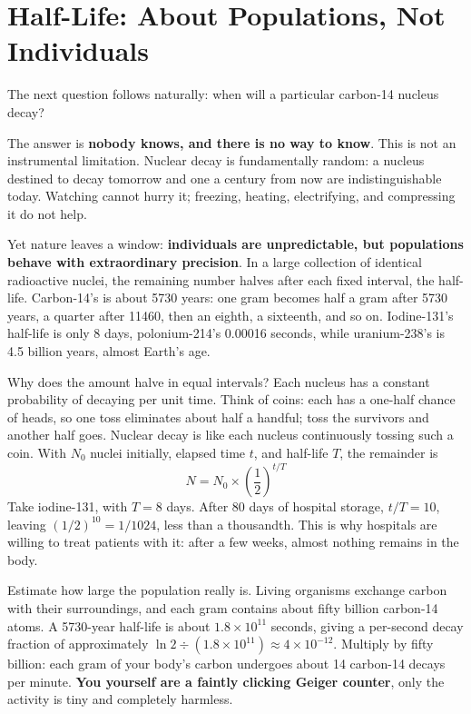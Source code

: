 \section{Half-Life: About Populations, Not Individuals}

The next question follows naturally: when will a particular carbon-14 nucleus decay?

The answer is \textbf{nobody knows, and there is no way to know}. This is not an instrumental limitation. Nuclear decay is fundamentally random: a nucleus destined to decay tomorrow and one a century from now are indistinguishable today. Watching cannot hurry it; freezing, heating, electrifying, and compressing it do not help.

Yet nature leaves a window: \textbf{individuals are unpredictable, but populations behave with extraordinary precision}. In a large collection of identical radioactive nuclei, the remaining number halves after each fixed interval, the half-life. Carbon-14's is about 5730 years: one gram becomes half a gram after 5730 years, a quarter after 11460, then an eighth, a sixteenth, and so on. Iodine-131's half-life is only 8 days, polonium-214's 0.00016 seconds, while uranium-238's is 4.5 billion years, almost Earth's age.

\begin{qiaoliang}
Why does the amount halve in equal intervals? Each nucleus has a constant probability of decaying per unit time. Think of coins: each has a one-half chance of heads, so one toss eliminates about half a handful; toss the survivors and another half goes. Nuclear decay is like each nucleus continuously tossing such a coin. With $N_0$ nuclei initially, elapsed time $t$, and half-life $T$, the remainder is
\[N = N_0 \times \left(\frac{1}{2}\right)^{t/T}\]
Take iodine-131, with $T=8$ days. After 80 days of hospital storage, $t/T=10$, leaving $(1/2)^{10}=1/1024$, less than a thousandth. This is why hospitals are willing to treat patients with it: after a few weeks, almost nothing remains in the body.
\end{qiaoliang}

Estimate how large the population really is. Living organisms exchange carbon with their surroundings, and each gram contains about fifty billion carbon-14 atoms. A 5730-year half-life is about $1.8\times 10^{11}$ seconds, giving a per-second decay fraction of approximately $\ln 2 \div (1.8\times 10^{11}) \approx 4\times 10^{-12}$. Multiply by fifty billion: each gram of your body's carbon undergoes about 14 carbon-14 decays per minute. \textbf{You yourself are a faintly clicking Geiger counter}, only the activity is tiny and completely harmless.

